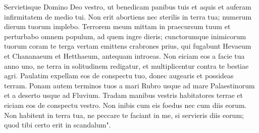 \begin{biblechapter}
\verse Servietisque Domino Deo vestro, ut benedicam panibus tuis et aquis et auferam infirmitatem de medio tui. 
\verse Non erit abortiens nec sterilis in terra tua; numerum dierum tuorum implebo. 
\verse Terrorem meum mittam in praecursum tuum et perturbabo omnem populum, ad quem ingre dieris; cunctorumque inimicorum tuorum coram te terga vertam 
\verse emittens crabrones prius, qui fugabunt Hevaeum et Chananaeum et Hetthaeum, antequam introeas. 
\verse Non eiciam eos a facie tua anno uno, ne terra in solitudinem redigatur, et multiplicentur contra te bestiae agri. 
\verse Paulatim expellam eos de conspectu tuo, donec augearis et possideas terram. 
\verse Ponam autem terminos tuos a mari Rubro usque ad mare Palaestinorum et a deserto usque ad Fluvium. Tradam manibus vestris habitatores terrae et eiciam eos de conspectu vestro. 
\verse Non inibis cum eis foedus nec cum diis eorum. 
\verse Non habitent in terra tua, ne peccare te faciant in me, si servieris diis eorum; quod tibi certo erit in scandalum". 
\end{biblechapter}

